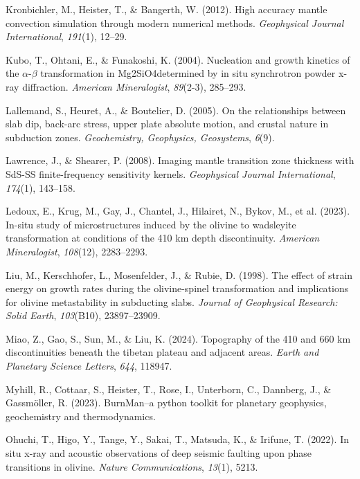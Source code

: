\documentclass[
  paper=a4,
  ,captions=tableheading
]{scrartcl}
\newlength{\cslhangindent}
\newenvironment{CSLReferences}[2] %
  {\begin{list}{}{%
   \setlength{\itemindent}{0pt}
   \setlength{\leftmargin}{0pt}
   \setlength{\parsep}{0pt}
   \ifodd #1
    \setlength{\leftmargin}{\cslhangindent}
    \setlength{\itemindent}{-1\cslhangindent}
   \fi
   \setlength{\itemsep}{#2\baselineskip}}}
  {\end{list}}
\begin{document}
\begin{CSLReferences}{1}{0}
Kronbichler, M., Heister, T., \& Bangerth, W. (2012). High accuracy
mantle convection simulation through modern numerical methods.
\emph{Geophysical Journal International}, \emph{191}(1), 12--29.

Kubo, T., Ohtani, E., \& Funakoshi, K. (2004). Nucleation and growth
kinetics of the \(\alpha\)-\(\beta\) transformation in Mg2SiO4determined
by in situ synchrotron powder x-ray diffraction. \emph{American
Mineralogist}, \emph{89}(2-3), 285--293.

Lallemand, S., Heuret, A., \& Boutelier, D. (2005). On the relationships
between slab dip, back-arc stress, upper plate absolute motion, and
crustal nature in subduction zones. \emph{Geochemistry, Geophysics,
Geosystems}, \emph{6}(9).

Lawrence, J., \& Shearer, P. (2008). Imaging mantle transition zone
thickness with SdS-SS finite-frequency sensitivity kernels.
\emph{Geophysical Journal International}, \emph{174}(1), 143--158.

{Ledoux, E., Krug, M., Gay, J., Chantel, J., Hilairet, N., Bykov, M., et
al.} (2023). In-situ study of microstructures induced by the olivine to
wadsleyite transformation at conditions of the 410 km depth
discontinuity. \emph{American Mineralogist}, \emph{108}(12), 2283--2293.

Liu, M., Kerschhofer, L., Mosenfelder, J., \& Rubie, D. (1998). The
effect of strain energy on growth rates during the olivine-spinel
transformation and implications for olivine metastability in subducting
slabs. \emph{Journal of Geophysical Research: Solid Earth},
\emph{103}(B10), 23897--23909.

Miao, Z., Gao, S., Sun, M., \& Liu, K. (2024). Topography of the 410 and
660 km discontinuities beneath the tibetan plateau and adjacent areas.
\emph{Earth and Planetary Science Letters}, \emph{644}, 118947.

Myhill, R., Cottaar, S., Heister, T., Rose, I., Unterborn, C., Dannberg,
J., \& Gassmöller, R. (2023). BurnMan--a python toolkit for planetary
geophysics, geochemistry and thermodynamics.

Ohuchi, T., Higo, Y., Tange, Y., Sakai, T., Matsuda, K., \& Irifune, T.
(2022). In situ x-ray and acoustic observations of deep seismic faulting
upon phase transitions in olivine. \emph{Nature Communications},
\emph{13}(1), 5213.


\end{CSLReferences}
\end{document}

